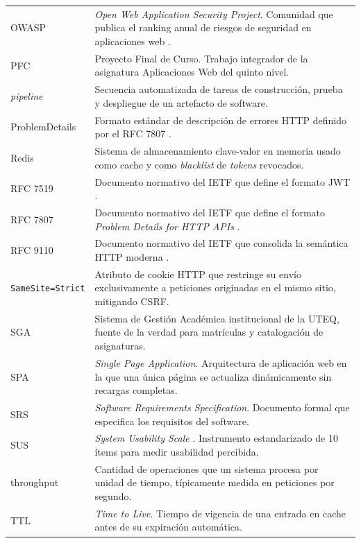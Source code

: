 \documentclass[11pt,a4paper,twoside]{report}
\begin{document}
\begin{longtable}{@{}p{3.2cm}p{11.5cm}@{}}
    OWASP & \emph{Open Web Application Security Project}. Comunidad que publica el ranking anual de riesgos de seguridad en aplicaciones web \cite{owasp2021top10}. \\
    PFC & Proyecto Final de Curso. Trabajo integrador de la asignatura Aplicaciones Web del quinto nivel. \\
    \emph{pipeline} & Secuencia automatizada de tareas de construcci\'on, prueba y despliegue de un artefacto de software. \\
    ProblemDetails & Formato est\'andar de descripci\'on de errores HTTP definido por el RFC 7807 \cite{rfc7807}. \\
    Redis & Sistema de almacenamiento clave-valor en memoria usado como cache y como \emph{blacklist} de \emph{tokens} revocados. \\
    RFC 7519 & Documento normativo del IETF que define el formato JWT \cite{jones2015jwt}. \\
    RFC 7807 & Documento normativo del IETF que define el formato \emph{Problem Details for HTTP APIs} \cite{rfc7807}. \\
    RFC 9110 & Documento normativo del IETF que consolida la sem\'antica HTTP moderna \cite{rfc9110}. \\
    \texttt{SameSite=Strict} & Atributo de cookie HTTP que restringe su env\'io exclusivamente a peticiones originadas en el mismo sitio, mitigando CSRF. \\
    SGA & Sistema de Gesti\'on Acad\'emica institucional de la UTEQ, fuente de la verdad para matr\'iculas y catalogaci\'on de asignaturas. \\
    SPA & \emph{Single Page Application}. Arquitectura de aplicaci\'on web en la que una \'unica p\'agina se actualiza din\'amicamente sin recargas completas. \\
    SRS & \emph{Software Requirements Specification}. Documento formal que especifica los requisitos del software. \\
    SUS & \emph{System Usability Scale} \cite{brooke1996sus}. Instrumento estandarizado de 10 \'items para medir usabilidad percibida. \\
    throughput & Cantidad de operaciones que un sistema procesa por unidad de tiempo, t\'ipicamente medida en peticiones por segundo. \\
    TTL & \emph{Time to Live}. Tiempo de vigencia de una entrada en cache antes de su expiraci\'on autom\'atica. \\
    \bottomrule
\end{longtable}
\end{document}
